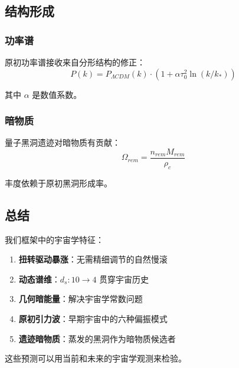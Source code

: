 \subsection{结构形成}

\subsubsection{功率谱}

原初功率谱接收来自分形结构的修正：
\begin{equation}
    P(k) = P_{\Lambda CDM}(k) \cdot (1 + \alpha \tau_0^2 \ln(k/k_*))
\end{equation}

其中 $\alpha$ 是数值系数。

\subsubsection{暗物质}

量子黑洞遗迹对暗物质有贡献：
\begin{equation}
    \Omega_{rem} = \frac{n_{rem} M_{rem}}{\rho_c}
\end{equation}

丰度依赖于原初黑洞形成率。

\subsection{总结}

我们框架中的宇宙学特征：
\begin{enumerate}
    \item \textbf{扭转驱动暴涨}：无需精细调节的自然慢滚
    \item \textbf{动态谱维}：$d_s: 10 \to 4$ 贯穿宇宙历史
    \item \textbf{几何暗能量}：解决宇宙学常数问题
    \item \textbf{原初引力波}：早期宇宙中的六种偏振模式
    \item \textbf{遗迹暗物质}：蒸发的黑洞作为暗物质候选者
\end{enumerate}

这些预测可以用当前和未来的宇宙学观测来检验。
